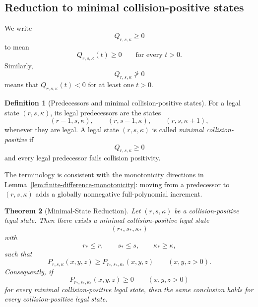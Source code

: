 \documentclass[11pt]{article}
\newtheorem{theorem}{Theorem}[section]
\theoremstyle{definition}
\newtheorem{definition}[theorem]{Definition}
\begin{document}
\subsection{Reduction to minimal collision-positive states}

We write
\begin{equation*}
Q_{r,s,\kappa}\ge0
\end{equation*}
to mean
\begin{equation*}
Q_{r,s,\kappa}(t)\ge0
\qquad\text{for every }t>0.
\end{equation*}
Similarly,
\begin{equation*}
Q_{r,s,\kappa}\not\ge0
\end{equation*}
means that \(Q_{r,s,\kappa}(t)<0\) for at least one \(t>0\).

\begin{definition}[Predecessors and minimal collision-positive states]
\label{def:minimal-collision-positive}
For a legal state \((r,s,\kappa)\), its legal predecessors are the states
\begin{equation*}
(r-1,s,\kappa),
\qquad
(r,s-1,\kappa),
\qquad
(r,s,\kappa+1),
\end{equation*}
whenever they are legal.
A legal state \((r,s,\kappa)\) is called \emph{minimal collision-positive} if
\begin{equation*}
Q_{r,s,\kappa}\ge0
\end{equation*}
and every legal predecessor fails collision positivity.
\end{definition}

The terminology is consistent with the monotonicity directions in Lemma~\ref{lem:finite-difference-monotonicity}: moving from a predecessor to \((r,s,\kappa)\) adds a globally nonnegative full-polynomial increment.

\begin{theorem}[Minimal-State Reduction]
\label{thm:minimal-state-reduction}
Let \((r,s,\kappa)\) be a collision-positive legal state.  Then there exists a minimal collision-positive legal state
\begin{equation*}
(r_*,s_*,\kappa_*)
\end{equation*}
with
\begin{equation*}
r_*\le r,
\qquad
s_*\le s,
\qquad
\kappa_*\ge\kappa,
\end{equation*}
such that
\begin{equation*}
P_{r,s,\kappa}(x,y,z)
\ge
P_{r_*,s_*,\kappa_*}(x,y,z)
\qquad(x,y,z>0).
\end{equation*}
Consequently, if
\begin{equation*}
P_{r_*,s_*,\kappa_*}(x,y,z)\ge0
\qquad(x,y,z>0)
\end{equation*}
for every minimal collision-positive legal state, then the same conclusion holds for every collision-positive legal state.
\end{theorem}
\end{document}
